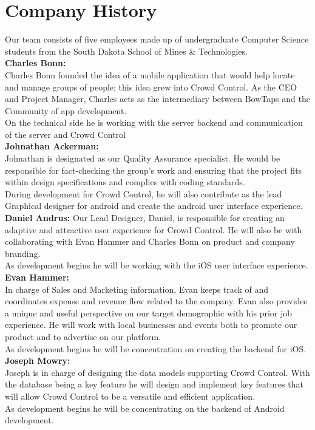 \section{Company History}

Our team consists of five employees made up of undergraduate Computer Science students from the South Dakota School of Mines \& Technologies. \\

\noindent
\textbf{Charles Bonn:}\\ Charles Bonn founded the idea of a mobile application that would help locate and manage groups of people; this idea grew into Crowd Control. As the CEO and Project Manager, Charles acts as the intermediary between BowTaps and the Community of app development. \\
On the technical side he is working with the server backend and communication of the server and Crowd Control \\

\noindent
\textbf{Johnathan Ackerman:}\\ Johnathan is designated as our Quality Assurance specialist. He would be responsible for fact-checking the group’s work and ensuring that the project fits within design specifications and complies with coding standards.\\
 During development for Crowd Control, he will also contribute as the lead Graphical designer for android and create the android user interface experience.\\
 
\noindent
\textbf{Daniel Andrus:} Our Lead Designer, Daniel, is responsible for creating an adaptive and attractive user experience for Crowd Control. He will also be with collaborating with Evan Hammer and Charles Bonn on product and company branding.\\
 As development begins he will be working with the iOS user interface experience.\\
 
\noindent
\textbf{Evan Hammer:}\\ In charge of Sales and Marketing information, Evan keeps track of and coordinates expense and revenue flow related to the company. Evan also provides a unique and useful perspective on our target demographic with his prior job experience. He will work with local businesses and events both to promote our product and to advertise on our platform.\\
 As development begins he will be concentration on creating the backend for iOS. \\
 
\noindent
\textbf{Joseph Mowry:}\\ Joseph is in charge of designing the data models supporting Crowd Control. With the database being a key feature he will design and implement key features that will allow Crowd Control to be a versatile and efficient application.\\
 As development begins he will be concentrating on the backend of Android development.\\






